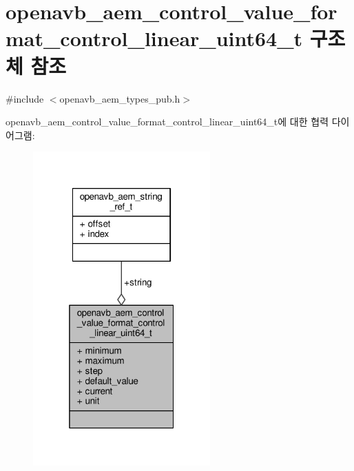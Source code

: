 \hypertarget{structopenavb__aem__control__value__format__control__linear__uint64__t}{}\section{openavb\+\_\+aem\+\_\+control\+\_\+value\+\_\+format\+\_\+control\+\_\+linear\+\_\+uint64\+\_\+t 구조체 참조}
\label{structopenavb__aem__control__value__format__control__linear__uint64__t}


{\ttfamily \#include $<$openavb\+\_\+aem\+\_\+types\+\_\+pub.\+h$>$}



openavb\+\_\+aem\+\_\+control\+\_\+value\+\_\+format\+\_\+control\+\_\+linear\+\_\+uint64\+\_\+t에 대한 협력 다이어그램\+:
\nopagebreak
\begin{figure}[H]
\begin{center}
\leavevmode
\includegraphics[width=193pt]{structopenavb__aem__control__value__format__control__linear__uint64__t__coll__graph}
\end{center}
\end{figure}
